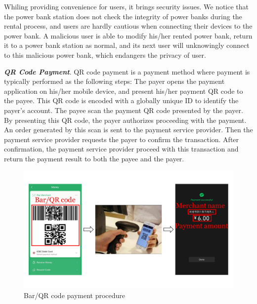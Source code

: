 

Whiling providing convenience for users, it brings security issues. We notice that the power bank station does not check the integrity of power banks during the rental process, and users are hardly cautious when connecting their devices to the power bank. A malicious user is able to modify his/her rented power bank, return it to a power bank station as normal, and its next user will unknowingly connect to this malicious power bank, which endangers the privacy of user.


\textbf{\textit{QR Code Payment}}. 
QR code payment is a payment method where payment is typically performed as the following steps:
 The payer opens the payment application on his/her mobile device, and present his/her payment QR code to the payee. This QR code is encoded with a globally unique ID to identify the payer's account. 
 The payee scan the payment QR code presented by the payer. By presenting this QR code, the payer authorizes proceeding with the payment.
 An order generated by this scan is sent to the payment service provider. Then the payment service provider requests the payer to confirm the transaction.
 After confirmation, the payment service provider proceed with this transaction and return the payment result to both the payee and the payer.

\begin{figure}[hbtp]
	\centering
	\includegraphics[width=\linewidth]{./Figs/qr_code_payment.png}
	\caption{Bar/QR code payment procedure}
	\label{fig:qr_payment_procedure}
\end{figure}


